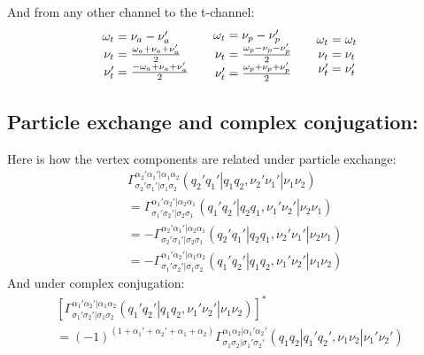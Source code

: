 \documentclass[12pt,a4paper,roman]{article}
\begin{document}
And from any other channel to the t-channel:
\begin{align}
    \begin{array}{r@{\mskip\thickmuskip}l}
    \omega_t &= \nu_a-\nu'_a\\
    \nu_t  &= \frac{ \omega_a+\nu_a+\nu'_a}{2}\\
    \nu'_t &= \frac{-\omega_a+\nu_a+\nu'_a}{2}\\
  \end{array}
  \quad  \begin{array}{r@{\mskip\thickmuskip}l}
    \omega_t &= \nu_p-\nu'_p\\
    \nu_t  &= \frac{\omega_p-\nu_p-\nu'_p}{2}\\
    \nu'_t &= \frac{\omega_p+\nu_p+\nu'_p}{2}\\
  \end{array} \quad
  \begin{array}{r@{\mskip\thickmuskip}l}
    \omega_t &= \omega_t\\
    \nu_t  &= \nu_t \\
    \nu'_t &= \nu'_t\\
  \end{array}
\end{align}



\subsection*{Particle exchange and complex conjugation:}
Here is how the vertex components are related under particle exchange:
\begin{align}
    &\Gamma_{\sigma_2'\sigma_1'|\sigma_1\sigma_2}^{\alpha_2'\alpha_1'|\alpha_1\alpha_2}(q_2'q_1'|q_1q_2, \nu_2'\nu_1'|\nu_1\nu_2) \\
    &= \Gamma_{\sigma_1'\sigma_2'|\sigma_2\sigma_1}^{\alpha_1'\alpha_2'|\alpha_2\alpha_1}(q_1'q_2'|q_2q_1, \nu_1'\nu_2'|\nu_2\nu_1) \\
    &= - \Gamma_{\sigma_2'\sigma_1'|\sigma_2\sigma_1}^{\alpha_2'\alpha_1'|\alpha_2\alpha_1}(q_2'q_1'|q_2q_1, \nu_2'\nu_1'|\nu_2\nu_1) \\
    &= - \Gamma_{\sigma_1'\sigma_2'|\sigma_1\sigma_2}^{\alpha_1'\alpha_2'|\alpha_1\alpha_2}(q_1'q_2'|q_1q_2, \nu_1'\nu_2'|\nu_1\nu_2)
\end{align}
And under complex conjugation:
\begin{multline}
    \left[ \Gamma_{\sigma_1'\sigma_2'|\sigma_1\sigma_2}^{\alpha_1'\alpha_2'|\alpha_1\alpha_2}(q_1'q_2'|q_1q_2, \nu_1'\nu_2'|\nu_1\nu_2) \right]^* \\ =
    (-1)^{(1+\alpha_1'+\alpha_2'+\alpha_1+\alpha_2)} \Gamma_{\sigma_1\sigma_2|\sigma_1'\sigma_2'}^{\alpha_1\alpha_2|\alpha_1'\alpha_2'}(q_1q_2|q_1'q_2', \nu_1\nu_2|\nu_1'\nu_2')
\end{multline}
\end{document}
